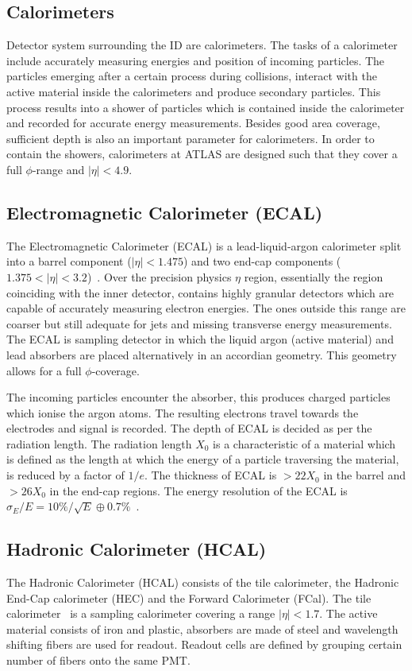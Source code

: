 \subsection{Calorimeters}
Detector system surrounding the ID are calorimeters. The tasks of a calorimeter include accurately measuring energies and position of incoming 
particles. The particles emerging after a certain process during collisions, interact with the active material inside the calorimeters and produce secondary particles. This process 
results into a shower of particles which is contained inside the calorimeter and recorded for accurate energy measurements. Besides good area coverage, 
sufficient depth is also an important parameter for calorimeters. In order to contain the showers, calorimeters at ATLAS are designed such that they cover a 
full $\phi$-range and $|\eta|<4.9$.  

\subsection*{Electromagnetic Calorimeter (ECAL)}
The Electromagnetic Calorimeter (ECAL) is a lead-liquid-argon calorimeter split into a barrel component ($|\eta|<1.475$) and two end-cap components 
($1.375 < |\eta| < 3.2$)~\cite{TheATLASCollaboration_2008}. Over the precision physics $\eta$ region, essentially the region coinciding with the inner detector, contains highly granular
detectors which are capable of accurately measuring electron energies. The ones outside this range are coarser but still adequate for jets and missing transverse energy measurements.
The ECAL is sampling detector in which the liquid argon (active material) and lead absorbers are placed alternatively in an accordian geometry. This geometry allows for a full 
$\phi$-coverage. 

The incoming particles encounter the absorber, this produces charged particles which ionise the argon atoms. The resulting electrons travel towards the electrodes and 
signal is recorded. The depth of ECAL is decided as per the radiation length. The radiation length $X_0$ is a characteristic of a material which is defined as 
the length at which the energy of a particle traversing the material, is reduced by a factor of $1/e$. The thickness of ECAL is $> 22 X_0$ in the barrel and $> 26 X_0$ in the end-cap
regions. The energy resolution of the ECAL is $\sigma_E/E = 10\%/\sqrt{E} \oplus 0.7\%$~\cite{CERN-LHCC-2017-018}.

\subsection*{Hadronic Calorimeter (HCAL)}
The Hadronic Calorimeter (HCAL) consists of the tile calorimeter, the Hadronic End-Cap calorimeter (HEC) and the Forward Calorimeter (FCal). The tile calorimeter~\cite{Francavilla_2012} is a sampling
calorimeter covering a range $|\eta|<1.7$. The active material consists of iron and plastic, absorbers are made of steel and wavelength shifting fibers are used for readout.
Readout cells are defined by grouping certain number of fibers onto the same PMT. 

